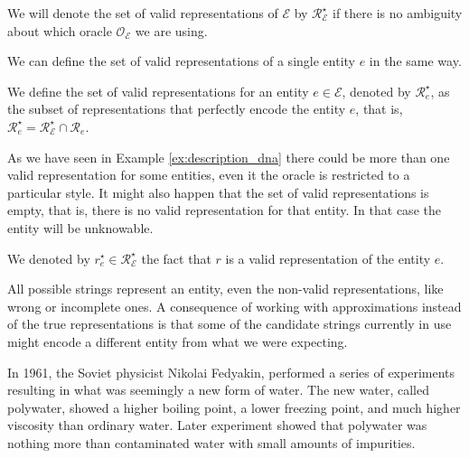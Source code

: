 \begin{notation}
We will denote the set of valid representations of $\mathcal{E}$ by $\mathcal{R}^\star_\mathcal{E}$ if there is no ambiguity about which oracle $\mathcal{O}_\mathcal{E}$ we are using.
\end{notation}

We can define the set of valid representations of a single entity $e$ in the same way.

\begin{definition}
We define the set of valid representations for an entity $e \in \mathcal{E}$, denoted by $\mathcal{R}^\star_e$, as the subset of representations that perfectly encode the entity $e$, that is, $\mathcal{R}^\star_e = \mathcal{R}^\star_\mathcal{E} \cap \mathcal{R}_e$.
\end{definition}

As we have seen in Example \ref{ex:description_dna} there could be more than one valid representation for some entities, even it the oracle is restricted to a particular style. It might also happen that the set of valid representations is empty, that is, there is no valid representation for that entity. In that case the entity will be unknowable.

\begin{notation}
We denoted by $r^\star_e \in \mathcal{R}^\star_\mathcal{E}$ the fact that $r$ is a valid representation of the entity $e$.
\end{notation}

All possible strings represent an entity, even the non-valid representations, like wrong or incomplete ones. A consequence of working with approximations instead of the true representations is that some of the candidate strings currently in use might encode a different entity from what we were expecting.

\begin{example}
\label{ex:polywater}
In 1961, the Soviet physicist Nikolai Fedyakin, performed a series of experiments resulting in what was seemingly a new form of water. The new water, called polywater, showed a higher boiling point, a lower freezing point, and much higher viscosity than ordinary water. Later experiment showed that polywater was nothing more than contaminated water with small amounts of impurities.
\end{example}

